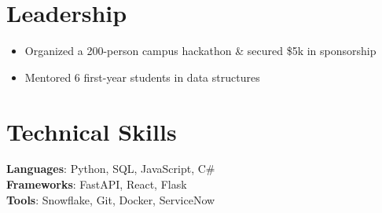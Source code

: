 \documentclass[letterpaper,11pt]{article}
\begin{document}
\section{Leadership}
  \begin{itemize}
    \item Organized a 200-person campus hackathon \& secured \$5k in sponsorship
    \item Mentored 6 first-year students in data structures
  \end{itemize}

\section{Technical Skills}
 \begin{itemize}[leftmargin=0.15in, label={}]
    \small{\item{
     \textbf{Languages}{: Python, SQL, JavaScript, C\#} \\
     \textbf{Frameworks}{: FastAPI, React, Flask} \\
     \textbf{Tools}{: Snowflake, Git, Docker, ServiceNow}
    }}
 \end{itemize}
\end{document}

